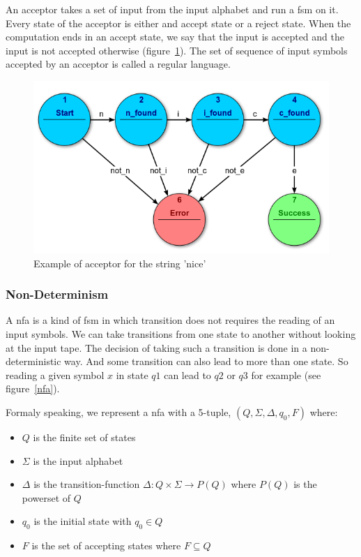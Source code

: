 \documentclass[12pt]{article}
\begin{document}
An acceptor takes a set of input from the input alphabet and run a \gls{fsm} on it. Every state of the acceptor is either and accept state or a reject state. When the computation ends in an accept state, we say that the input is accepted and the input is not accepted otherwise (figure~\ref{acceptor}). The set of sequence of input symbols accepted by an acceptor is called a regular language.\\

\begin{figure}
    \centering
    \includegraphics[scale=0.8]{acceptor.png}
    \caption{Example of acceptor for the string 'nice'~\cite{FSM:2017}}
    \label{acceptor}
\end{figure}

\subsubsection{Non-Determinism}

A \gls{nfa} is a kind of \gls{fsm} in which transition does not requires the reading of an input symbols. We can take transitions from one state to another without looking at the input tape. The decision of taking such a transition is done in a non-deterministic way. And some transition can also lead to more than one state. So reading a given symbol $x$ in state $q1$ can lead to $q2$ or $q3$ for example (see figure~\ref{nfa}).~\cite{FA-DecisionProblems:1959}

Formaly speaking, we represent a \gls{nfa} with a 5-tuple, $(Q, \Sigma, \Delta, q_0, F)$ where:

\begin{itemize}
\item $Q$ is the finite set of states
\item $\Sigma$ is the input alphabet
\item $\Delta$ is the transition-function $\Delta: Q \times \Sigma \rightarrow P(Q)$ where $P(Q)$ is the powerset of $Q$
\item $q_0$ is the initial state with $q_0 \in Q$
\item $F$ is the set of accepting states where $F \subseteq Q$
\end{itemize}
\end{document}
